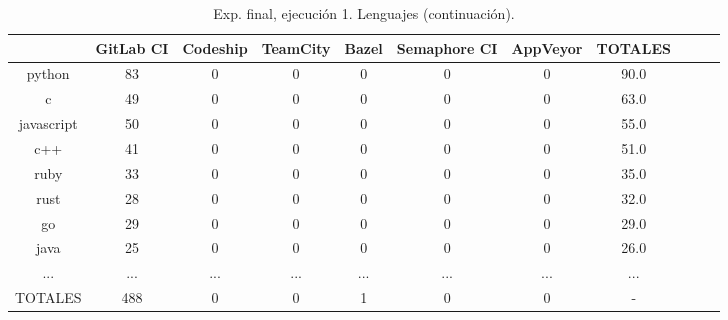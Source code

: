 \begin{table}[h]
  \centering
  \caption{Exp. final, ejecución 1. Lenguajes (continuación).}
  \label{tab:tabla_f1_6b}

\begin{footnotesize}
\renewcommand{\arraystretch}{1.5} %
\begin{tabular}{ccccccccccc}
  \hline
  {} &  GitLab CI &  Codeship &  TeamCity &  Bazel &  Semaphore CI &  AppVeyor &  TOTALES \\
  \hline
  python           &        83 &         0 &         0 &      0 &             0 &         0 &     90.0 \\
  c                &        49 &         0 &         0 &      0 &             0 &         0 &     63.0 \\
  javascript       &        50 &         0 &         0 &      0 &             0 &         0 &     55.0 \\
  c++              &        41 &         0 &         0 &      0 &             0 &         0 &     51.0 \\
  ruby             &        33 &         0 &         0 &      0 &             0 &         0 &     35.0 \\
  rust             &        28 &         0 &         0 &      0 &             0 &         0 &     32.0 \\
  go               &        29 &         0 &         0 &      0 &             0 &         0 &     29.0 \\
  java             &        25 &         0 &         0 &      0 &             0 &         0 &     26.0 \\
  ...              &       ... &       ... &       ... &    ... &           ... &       ... &      ... \\
  TOTALES          &       488 &         0 &         0 &      1 &             0 &         0 &        - \\
 \end{tabular}
\end{footnotesize}

\end{table}

